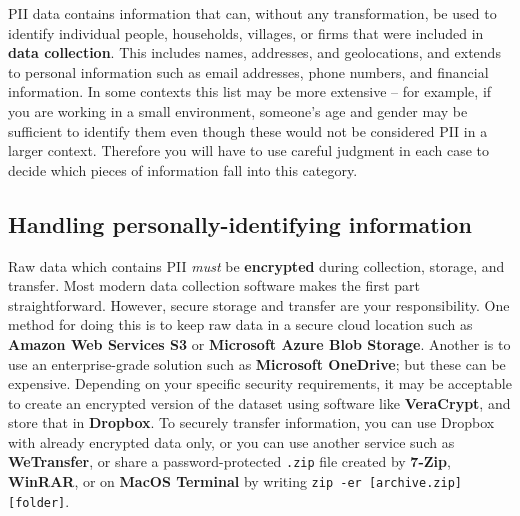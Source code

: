 PII data contains information that can, without any transformation, be used to identify
individual people, households, villages, or firms that were included in \textbf{data collection}.
This includes names, addresses, and geolocations, and extends to personal information
such as email addresses, phone numbers, and financial information.
In some contexts this list may be more extensive --
for example, if you are working in a small environment,
someone's age and gender may be sufficient to identify them
even though these would not be considered PII in a larger context.
Therefore you will have to use careful judgment in each case
to decide which pieces of information fall into this category.

\subsection{Handling personally-identifying information}

Raw data which contains PII \textit{must} be \textbf{encrypted}
during collection, storage, and transfer.
Most modern data collection software makes the first part straightforward.
However, secure storage and transfer are your responsibility.
One method for doing this is to keep raw data in a secure cloud location such as \textbf{Amazon Web Services S3} or \textbf{Microsoft Azure Blob Storage}.
Another is to use an enterprise-grade solution such as \textbf{Microsoft OneDrive}; but these can be expensive.
Depending on your specific security requirements,
it may be acceptable to create an encrypted version of the dataset
using software like \textbf{VeraCrypt}, and store that in \textbf{Dropbox}.
To securely transfer information,
you can use Dropbox with already encrypted data only,
or you can use another service such as \textbf{WeTransfer},
or share a password-protected \texttt{.zip} file created by \textbf{7-Zip},
\textbf{WinRAR},
or on \textbf{MacOS Terminal} by writing \texttt{zip -er [archive.zip] [folder]}.

